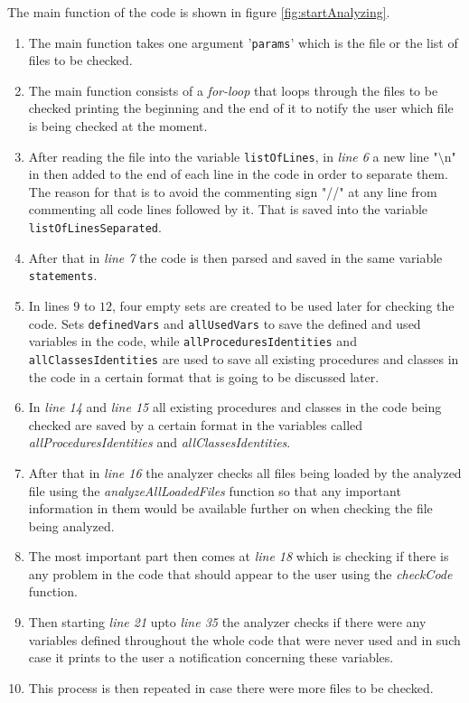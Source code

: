 \documentclass[11pt]{report}
\begin{document}
The main function of the code is shown in figure \ref{fig:startAnalyzing}.
\begin{enumerate}
\item The main function takes one argument '\texttt{params}' which is the file or the list of files to be checked.
\item The main function consists of a \textsl{for-loop} that loops through the files to be checked printing the beginning and the end of it to notify the user which file is being checked at the moment. 
\item After reading the file into the variable \texttt{listOfLines}, in \textsl{line 6} a new line "$\setminus$n" in then added to the end of each line in the code in order to separate them. The reason for that is to avoid the commenting sign "//" at any line from commenting all code lines followed by it. That is saved into the variable \texttt{listOfLinesSeparated}.
\item After that in \textsl{line 7} the code is then parsed and saved in the same variable \texttt{statements}.
\item In lines $9$ to $12$, four empty sets are created to be used later for checking the code. Sets \texttt{definedVars} and \texttt{allUsedVars} to save the defined and used variables in the code, while \texttt{allProceduresIdentities} and \texttt{allClassesIdentities} are used to save all existing procedures and classes in the code in a certain format that is going to be discussed later.
\item In \textsl{line 14} and \textsl{line 15} all existing procedures and classes in the code being checked are saved by a certain format in the variables called \textsl{allProceduresIdentities} and \textsl{allClassesIdentities}.
\item After that in \textsl{line 16} the analyzer checks all files being loaded by the analyzed file using the \textsl{analyzeAllLoadedFiles} function so that any important information in them would be available further on when checking the file being analyzed.
\item The most important part then comes at \textsl{line 18} which is checking if there is any problem in the code that should appear to the user using the \textsl{checkCode} function.
\item Then starting \textsl{line 21} upto \textsl{line 35} the analyzer checks if there were any variables defined throughout the whole code that were never used and in such case it prints to the user a notification concerning these variables.
\item This process is then repeated in case there were more files to be checked.
\end{enumerate}
\end{document}

